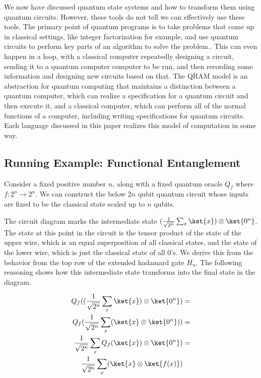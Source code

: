 We now have discussed quantum state systems and how to transform them using quantum circuits.
However, these tools do not tell we can effectively use these tools.
The primary point of quantum programs is to take problems that come up in classical settings, like integer factorization for example, and use quantum circuits to perform key parts of an algorithm to solve the problem..
This can even happen in a loop, with a classical computer repeatedly designing a circuit, sending it to a quantum computer computer to be run, and then recording some information and designing new circuits based on that.
The QRAM model is an abstraction for quantum computing that maintains a distinction between a quantum computer, which can realize a specification for a quantum circuit and then execute it, and a classical computer, which can perform all of the normal functions of a computer, including writing specifications for quantum circuits.
Each language discussed in this paper realizes this model of computation in some way.

\subsection{Running Example: Functional Entanglement}
Consider a fixed positive number $n$, along with a fixed quantum oracle $Q_f$ where $f : 2 ^ n \rightarrow 2 ^ n$. We can construct the below $2n$ qubit quantum circuit whose inputs are fixed to be the classical state  scaled up to $n$ qubits.



The circuit diagram marks the intermediate state $(\frac{1}{\sqrt{2^n}}\sum_x\ket{x})\otimes\ket{0^n}$.
The state at this point in the circuit is the tensor product of the state of the upper wire, which is an equal superposition of all classical states, and the state of the lower wire, which is just the classical state of all 0’s.
We derive this from the behavior from the top row of the extended hadamard gate $H_n$.
The following reasoning shows how this intermediate state transforms into the final state in the diagram.

\begin{align}
Q_f ((\frac{1}{\sqrt{2^n}}\sum_x\ket{x})\otimes\ket{0^n}) &=\\
Q_f(\frac{1}{\sqrt{2^n}}\sum_x(\ket{x}\otimes\ket{0^n})) &=\\
\frac{1}{\sqrt{2^n}}\sum_xQ_f(\ket{x})\otimes\ket{0^n}) &=\\
\frac{1}{\sqrt{2^n}}\sum_x (\ket{x} \otimes\ket{f(x)})
\end{align}

